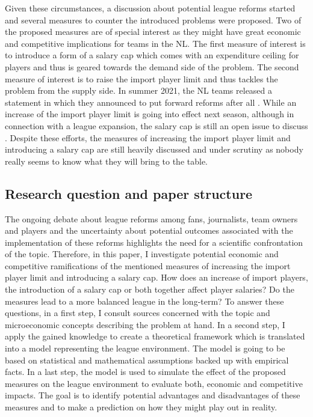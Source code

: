 \documentclass[12pt,a4paper]{article}\usepackage[]{graphicx}\usepackage[]{xcolor}
\begin{document}
\par
\noindent
Given these circumstances, a discussion about potential league reforms started and several measures to counter the introduced problems were proposed. Two of the proposed measures are of special interest as they might have great economic and competitive implications for teams in the NL. The first measure of interest is to introduce a form of a salary cap which comes with an expenditure ceiling for players and thus is geared towards the demand side of the problem. The second measure of interest is to raise the import player limit and thus tackles the problem from the supply side. In summer 2021, the NL teams released a statement in which they announced to put forward reforms after all \citep[see][]{stettler_neu_2021}. While an increase of the import player limit is going into effect next season, although in connection with a league expansion, the salary cap is still an open issue to discuss \citep[see][]{germann_eishockeysaison_2021}. Despite these efforts, the measures of increasing the import player limit and introducing a salary cap are still heavily discussed and under scrutiny as nobody really seems to know what they will bring to the table.


\subsection{Research question and paper structure}

The ongoing debate about league reforms among fans, journalists, team owners and players and the uncertainty about potential outcomes associated with the implementation of these reforms highlights the need for a scientific confrontation of the topic. Therefore, in this paper, I investigate potential economic and competitive ramifications of the mentioned measures of increasing the import player limit and introducing a salary cap. How does an increase of import players, the introduction of a salary cap or both together affect player salaries? Do the measures lead to a more balanced league in the long-term? To answer these questions, in a first step, I consult sources concerned with the topic and microeconomic concepts describing the problem at hand. In a second step, I apply the gained knowledge to create a theoretical framework which is translated into a model representing the league environment. The model is going to be based on statistical and mathematical assumptions backed up with empirical facts. In a last step, the model is used to simulate the effect of the proposed measures on the league environment to evaluate both, economic and competitive impacts. The goal is to identify potential advantages and disadvantages of these measures and to make a prediction on how they might play out in reality.
\end{document}
